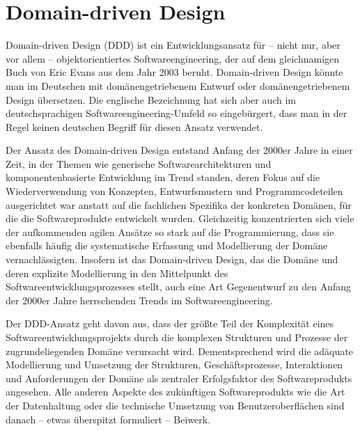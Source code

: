 \section{Domain-driven Design}

Domain-driven Design (DDD) ist ein Entwicklungsansatz für – nicht nur, aber vor allem – objektorientiertes Softwareengineering, der auf dem gleichnamigen Buch von Eric Evans aus dem Jahr 2003 \cite{eva03} beruht. Domain-driven Design könnte man im Deutschen mit domänengetriebenem Entwurf oder domänengetriebenem Design übersetzen. Die englische Bezeichnung hat sich aber auch im deutschsprachigen Softwareengineering-Umfeld so eingebürgert, dass man in der Regel keinen deutschen Begriff für diesen Ansatz verwendet.

Der Ansatz des Domain-driven Design entstand Anfang der 2000er Jahre in einer Zeit, in der Themen wie generische Softwarearchitekturen und komponentenbasierte
Entwicklung im Trend standen, deren Fokus auf die Wiederverwendung von Konzepten, Entwurfsmustern 
und Programmcodeteilen ausgerichtet war anstatt auf die fachlichen Spezifika der konkreten Domänen, für die die Softwareprodukte entwickelt wurden. Gleichzeitig konzentrierten sich viele der aufkommenden agilen Ansätze so stark auf die Programmierung, dass sie ebenfalls häufig die systematische Erfassung und Modellierung der Domäne vernachlässigten. Insofern ist das Domain-driven Design, das die Domäne und deren explizite Modellierung in den Mittelpunkt des Softwareentwicklungsprozesses stellt, auch eine Art Gegenentwurf zu den Anfang der 2000er Jahre herrschenden Trends im Softwareengineering.

Der DDD-Ansatz geht davon aus, dass der größte Teil der Komplexität 
eines Softwareentwicklungsprojekts durch die komplexen Strukturen und Prozesse der zugrundeliegenden Domäne verursacht wird. Dementsprechend wird die adäquate Modellierung und Umsetzung der Strukturen, Geschäftsprozesse, Interaktionen und Anforderungen der Domäne als zentraler Erfolgsfaktor des Softwareprodukts angesehen. Alle anderen Aspekte des zukünftigen Softwareprodukts wie die Art der Datenhaltung oder die technische Umsetzung von Benutzeroberflächen sind danach – etwas überspitzt formuliert – Beiwerk. 

